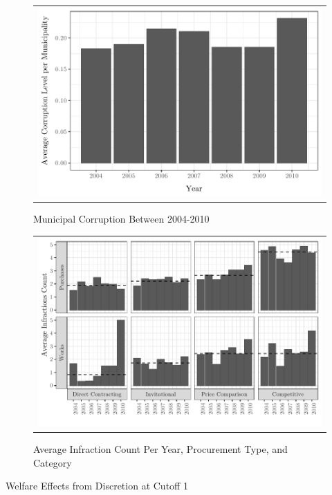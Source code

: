 \documentclass[11pt]{article}
\begin{document}
\begin{figure}[!htbp]
\caption{Municipal Corruption Between 2004-2010}
\label{fig:01discussion}
\centering
\small
\begin{tabular}{c}
\includegraphics[scale = .70]{../plots/01discussionplot.pdf}
\end{tabular}
\end{figure}

\begin{figure}[!htbp]
\caption{Average Infraction Count Per Year, Procurement Type, and Category}
\label{fig:02discussion}
\centering
\small
\begin{tabular}{c}
\includegraphics[scale = 1]{../plots/02discussionplot.pdf}
\end{tabular}
\end{figure}

\begin{table}[!ht]
\centering
\caption{Welfare Effects from Discretion at Cutoff 1}\label{tab:welfare}
\vspace{-10pt}

\end{table}
\end{document}

